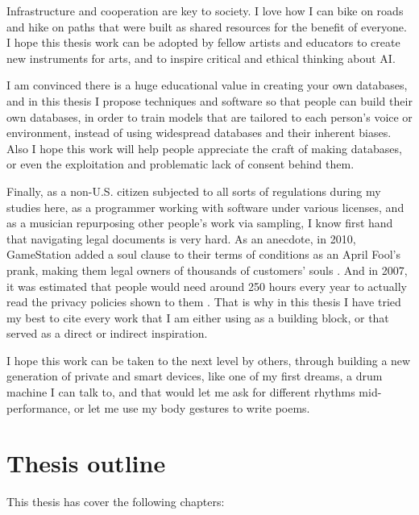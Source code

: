 Infrastructure and cooperation are key to society. I love how I can bike on roads and hike on paths that were built as shared resources for the benefit of everyone. I hope this thesis work can be adopted by fellow artists and educators to create new instruments for arts, and to inspire critical and ethical thinking about \acrshort{AI}.

I am convinced there is a huge educational value in creating your own databases, and in this thesis I propose techniques and software so that people can build their own databases, in order to train models that are tailored to each person's voice or environment, instead of using widespread databases and their inherent biases. Also I hope this work will help people appreciate the craft of making databases, or even the exploitation and problematic lack of consent behind them.

Finally, as a non-U.S. citizen subjected to all sorts of regulations during my studies here, as a programmer working with software under various licenses, and as a musician repurposing other people's work via sampling, I know first hand that navigating legal documents is very hard. As an anecdote, in 2010, GameStation added a soul clause to their terms of conditions as an April Fool's prank, making them legal owners of thousands of customers' souls \cite{website-huffpost-gamestation-soul-clause}. And in 2007, it was estimated that people would need around 250 hours every year to actually read the privacy policies shown to them \cite{article-cost-of-reading-privacy-policies}. That is why in this thesis I have tried my best to cite every work that I am either using as a building block, or that served as a direct or indirect inspiration.

I hope this work can be taken to the next level by others, through building a new generation of private and smart devices, like one of my first dreams, a drum machine I can talk to, and that would let me ask for different rhythms mid-performance, or let me use my body gestures to write poems.

\section{Thesis outline}

This thesis has cover the following chapters:

